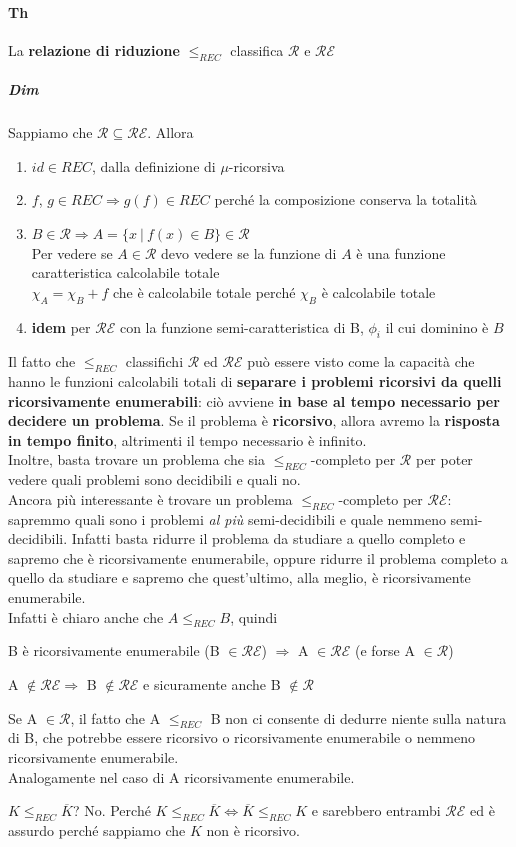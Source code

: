 \documentclass[10pt]{book}
\begin{document}
\paragraph{Th} La \textbf{relazione di riduzione} $\leq_{REC}$ classifica $\mathscr{R}$ e $\mathscr{RE}$
\subparagraph{Dim} Sappiamo che $\mathscr{R} \subseteq \mathscr{RE}$. Allora
\begin{enumerate}
	\item $id \in REC$, dalla definizione di $\mu$-ricorsiva
	\item $f$, $g \in REC \Rightarrow g(f) \in REC$ perché la composizione conserva la totalità
	\item $B \in \mathscr{R} \Rightarrow A = \{x \:|\: f(x) \in B\} \in \mathscr{R}$\\
	Per vedere se $A \in \mathscr{R}$ devo vedere se la funzione di $A$ è una funzione caratteristica calcolabile totale\\
	$\chi_A = \chi_B + f$ che è calcolabile totale perché $\chi_B$ è calcolabile totale
	\item \textbf{idem} per $\mathscr{RE}$ con la funzione semi-caratteristica di B, $\phi_i$ il cui dominino è $B$
\end{enumerate}
Il fatto che $\leq_{REC}$ classifichi $\mathscr{R}$ ed $\mathscr{RE}$ può essere visto come la capacità che hanno le funzioni calcolabili totali di \textbf{separare i problemi ricorsivi da quelli ricorsivamente enumerabili}: ciò avviene \textbf{in base al tempo necessario per decidere un problema}. Se il problema è \textbf{ricorsivo}, allora avremo la \textbf{risposta in tempo finito}, altrimenti il tempo necessario è infinito.\\
Inoltre, basta trovare un problema che sia $\leq_{REC}$-completo per $\mathscr{R}$ per poter vedere quali problemi sono decidibili e quali no.\\
Ancora più interessante è trovare un problema $\leq_{REC}$-completo per $\mathscr{RE}$: sapremmo quali sono i problemi \textit{al più} semi-decidibili e quale nemmeno semi-decidibili. Infatti basta ridurre il problema da studiare a quello completo e sapremo che è ricorsivamente enumerabile, oppure ridurre il problema completo a quello da studiare e sapremo che quest'ultimo, alla meglio, è ricorsivamente enumerabile.\\
Infatti è chiaro anche che $A \leq_{REC} B$, quindi
\begin{list}{}{}
	\item B è ricorsivamente enumerabile (B $\in \mathscr{RE}$) $\Rightarrow$ A $\in \mathscr{RE}$ (e forse A $\in \mathscr{R}$)
	\item A $\not\in\mathscr{RE} \Rightarrow$ B $\not\in\mathscr{RE}$ e sicuramente anche B $\not\in\mathscr{R}$
	\item Se A $\in\mathscr{R}$, il fatto che A $\leq_{REC}$ B non ci consente di dedurre niente sulla natura di B, che potrebbe essere ricorsivo o ricorsivamente enumerabile o nemmeno ricorsivamente enumerabile.\\
	Analogamente nel caso di A ricorsivamente enumerabile.
\end{list}
$K \leq_{REC} \overline{K}$? No. Perché $K \leq_{REC} \overline{K} \Leftrightarrow \overline{K} \leq_{REC} K$ e sarebbero entrambi $\mathscr{RE}$ ed è assurdo perché sappiamo che $K$ non è ricorsivo.
\end{document}
